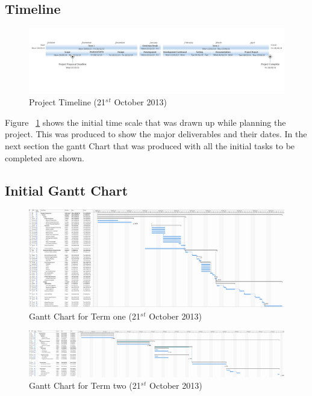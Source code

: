 \begin{landscape}

\subsection{Timeline}

\begin{figure}[H]
  \centering
  \includegraphics[width=\linewidth]{images/timeline1.png}
  \caption{Project Timeline (21$^s$$^t$ October 2013)}
  \label{fig:timeline1}
\end{figure}

Figure ~\ref{fig:timeline1} shows the initial time scale that was drawn up while
planning the project. This was produced to show the major deliverables and their
dates. In the next section the gantt Chart that was produced with all the
initial tasks to be completed are shown.

\newpage 
\subsection{Initial Gantt Chart}

\begin{figure}[H]
  \centering
  \includegraphics[width=\linewidth]{images/gant_chart1_term1.png}
  \caption{Gantt Chart for Term one (21$^s$$^t$ October 2013)}
  \label{fig:ganttinitialterm1}
\end{figure}

\begin{figure}[H]
  \centering
  \includegraphics[width=\linewidth]{images/gant_chart1_term2.png}
  \caption{Gantt Chart for Term two (21$^s$$^t$ October 2013)}
  \label{fig:ganttinitialterm2}
\end{figure}


\end{landscape}
